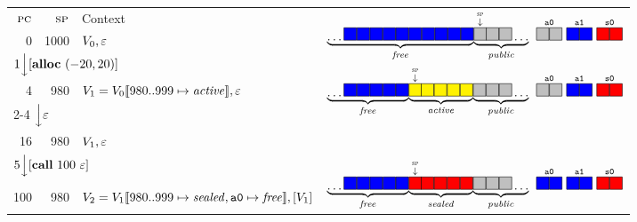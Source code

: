 \documentclass[10pt,conference]{ieeetran}%
\theoremstyle{definition}
\begin{document}
\begin{figure}
  \begin{tabular}{|r|r||l|r}
    \cline{1-3}
    \(\textsc{pc}\) & \(\textsc{sp}\) & Context &
    \multirow{3}{*}{\(\underbrace{\dots \freebox \freebox \freebox \freebox \freebox
        \freebox \freebox \freebox \freebox \freebox}_\unsealed
      \! \underbrace{\stackrel{\stackrel{\SP}{\downarrow}}{\pubbox} \!\! \pubbox \pubbox \dots}_\public
      ~ \stackrel{\mathtt{a0}}{\pubbox\pubbox} ~ \stackrel{\mathtt{a1}}{\freebox\freebox}
      ~ \stackrel{\mathtt{s0}}{\sealbox\sealbox}
      \)} \\
    \cline{1-3}
    0 & 1000 & \(V_0, \varepsilon\)
    \\
    \cline{1-3}
    \multicolumn{3}{l}{\multirow{2}{*}{\(1 \Big\downarrow [\mathbf{alloc} ~ (-20,20)]\)}} & \\
    \multicolumn{3}{l}{} &
    \multirow{3}{*}{\(\underbrace{\dots \freebox \freebox \freebox \freebox \freebox}_\unsealed
      \! \underbrace{\stackrel{\stackrel{\SP}{\downarrow}}{\objbox} \!\! \objbox \objbox \objbox \objbox}_\object
      \! \underbrace{\pubbox \pubbox \pubbox \dots}_\public
      ~ \stackrel{\mathtt{a0}}{\pubbox\pubbox} ~ \stackrel{\mathtt{a1}}{\freebox\freebox}
      ~ \stackrel{\mathtt{s0}}{\sealbox\sealbox}
      \)}
    \\
    \cline{1-3}
    4 & 980 & \(V_1 = V_0 \llbracket 980..999 \mapsto \mathit{active}\rrbracket, \varepsilon\) &
    \\
    \cline{1-3}
    \multicolumn{3}{l}{\multirow{2}{*}{2-4 \(\Big\downarrow \varepsilon\)}} \\ \multicolumn{3}{l}{} \\
    \cline{1-3}
    16 & 980 & \(V_1, \varepsilon\) & \\
    \cline{1-3}
    \multicolumn{3}{l}{\multirow{2}{*}{\(5 \Big\downarrow [\mathbf{call} ~ 100 ~ \varepsilon]\)}} & \\
    \multicolumn{3}{l}{} &
    \multirow{3}{*}{\(\underbrace{\dots \freebox \freebox \freebox \freebox \freebox}_\unsealed
      \! \underbrace{\stackrel{\stackrel{\SP}{\downarrow}}{\sealbox} \!\! \sealbox \sealbox \sealbox \sealbox}_\sealed
      \! \underbrace{\pubbox \pubbox \pubbox \dots}_\public
      ~ \stackrel{\mathtt{a0}}{\freebox\freebox} ~ \stackrel{\mathtt{a1}}{\freebox\freebox}
      ~ \stackrel{\mathtt{s0}}{\sealbox\sealbox}
      \)}
    \\
    \cline{1-3}
    100 & 980 & \(V_2 = V_1 \llbracket 980..999 \mapsto \mathit{sealed}, \mathtt{a0} \mapsto \mathit{free}\rrbracket,[V_1]\) & \\

\end{tabular}
\end{figure}
\end{document}
